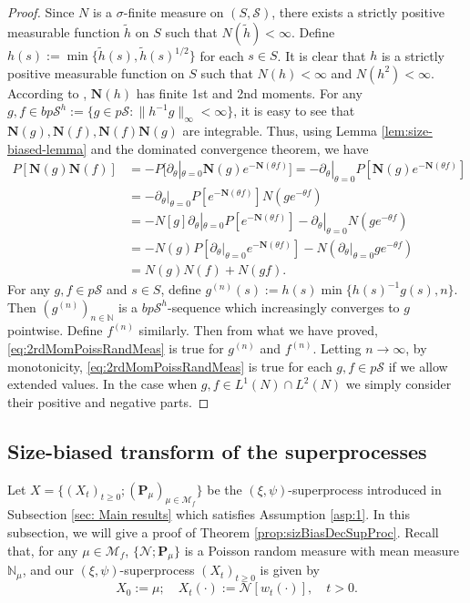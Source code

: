 \documentclass[UTF8]{pkuthss}
\theoremstyle{plain}
\theoremstyle{definition}
\numberwithin{equation}{section}
\begin{document}
\begin{proof}
	Since $N$ is a $\sigma$-finite measure on $(S, \mathscr S)$, there exists a strictly positive measurable function $\tilde h$ on $S$ such that $N(\tilde h)<\infty$.
	Define $h(s) := \min\{ \tilde h(s), \tilde h(s)^{1/2} \}$ for each $s \in S$.
	It is clear that $h$ is a strictly positive measurable function on $S$ such that $N(h) < \infty$ and $N(h^2) < \infty$.
	According to \cite[Theorem 2.7]{Kyprianou2014Fluctuations}, $\mathbf N(h)$ has finite 1st and 2nd moments.
	For any $g, f \in bp\mathscr S^h := \{g \in p\mathscr S: \|h^{-1} g\|_\infty < \infty\}$, it is easy to see that $\mathbf N(g), \mathbf N(f), \mathbf N(f) \mathbf N(g)$ are integrable.
	Thus, using Lemma \ref{lem:size-biased-lemma} and the dominated convergence theorem, we have
\begin{align}
	P [\mathbf N(g) \mathbf N(f)]
	&= - P[\partial_\theta|_{\theta = 0} \mathbf N(g) e^{-\mathbf N(\theta f)}]
	= - \partial_\theta|_{\theta = 0} P[\mathbf N(g) e^{-\mathbf N(\theta f)}]\\
	&= - \partial_\theta|_{\theta = 0} P[e^{-\mathbf N(\theta f)}]N(ge^{-\theta f})\\
	&= - N[g] \partial_\theta|_{\theta = 0} P[e^{-\mathbf N(\theta f)}] - \partial_\theta|_{\theta = 0} N(ge^{- \theta f}) \\
	&= - N(g) P[ \partial_\theta|_{\theta = 0} e^{-\mathbf N(\theta f)}] - N( \partial_\theta|_{\theta = 0} g e^{-\theta f}) \\
	&= N(g) N(f) + N(g f).
\end{align}
	For any $g,f\in p\mathscr S$ and $s \in S$, define $g^{(n)}(s) := h(s) \min\{h(s)^{-1}g(s),n\}$.
	Then $(g^{(n)})_{n\in \mathbb N}$ is a $bp\mathscr S^h$-sequence which increasingly converges to $g$ pointwise.
	Define $f^{(n)}$ similarly.
	Then from what we have proved, \eqref{eq:2rdMomPoissRandMeas} is true for $g^{(n)}$ and $f^{(n)}$.
	Letting $n\to\infty$, by monotonicity, \eqref{eq:2rdMomPoissRandMeas} is true for each $g,f\in p\mathscr S$ if we allow extended values.
	In the case when $g,f\in L^1(N) \cap L^2(N)$ we simply consider their positive and negative parts.
\end{proof}

\subsection{Size-biased transform of the superprocesses}
\label{sec: size-biased transform of the superprocesses}
	Let $X=\{(X_t)_{t\geq 0}; (\mathbf P_\mu)_{\mu \in \mathcal M_f}\}$ be the $(\xi,\psi)$-superprocess introduced in Subsection \ref{sec: Main results} which satisfies Assumption \ref{asp:1}.
	In this subsection, we will give a proof of Theorem \ref{prop:sizBiasDecSupProc}.
 Recall that, for any $\mu\in \mathcal M_f$, $\{\mathcal N; \mathbf P_\mu\}$ is a Poisson random measure
	with mean measure $\mathbb N_\mu$,
	and our $(\xi,\psi)$-superprocess $(X_t)_{t\ge 0}$ is  given by
\[
	X_0 := \mu;
	\quad X_t(\cdot)
	:=\mathcal N[w_t(\cdot)],
	\quad t>0.
\]
\end{document}
